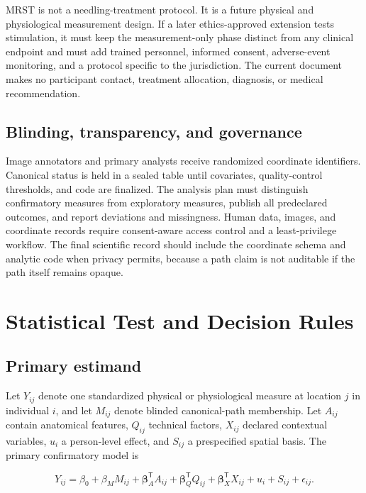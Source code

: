 \documentclass[conference]{IEEEtran}
\begin{document}
MRST is not a needling-treatment protocol. It is a future physical and physiological measurement design. If a later ethics-approved extension tests stimulation, it must keep the measurement-only phase distinct from any clinical endpoint and must add trained personnel, informed consent, adverse-event monitoring, and a protocol specific to the jurisdiction. The current document makes no participant contact, treatment allocation, diagnosis, or medical recommendation.

\subsection{Blinding, transparency, and governance}

Image annotators and primary analysts receive randomized coordinate identifiers. Canonical status is held in a sealed table until covariates, quality-control thresholds, and code are finalized. The analysis plan must distinguish confirmatory measures from exploratory measures, publish all predeclared outcomes, and report deviations and missingness. Human data, images, and coordinate records require consent-aware access control and a least-privilege workflow. The final scientific record should include the coordinate schema and analytic code when privacy permits, because a path claim is not auditable if the path itself remains opaque.

\section{Statistical Test and Decision Rules}

\subsection{Primary estimand}

Let \(Y_{ij}\) denote one standardized physical or physiological measure at location \(j\) in individual \(i\), and let \(M_{ij}\) denote blinded canonical-path membership. Let \(A_{ij}\) contain anatomical features, \(Q_{ij}\) technical factors, \(X_{ij}\) declared contextual variables, \(u_i\) a person-level effect, and \(S_{ij}\) a prespecified spatial basis. The primary confirmatory model is

\begin{equation}
Y_{ij} = \beta_0 + \beta_M M_{ij} + \boldsymbol{\beta}_A^{\mathsf{T}} A_{ij}
+ \boldsymbol{\beta}_Q^{\mathsf{T}} Q_{ij} + \boldsymbol{\beta}_X^{\mathsf{T}} X_{ij}
+ u_i + S_{ij} + \epsilon_{ij}.
\label{eq:mixed}
\end{equation}
\end{document}
